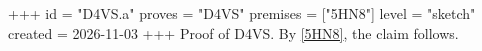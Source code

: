 +++
id = "D4VS.a"
proves = "D4VS"
premises = ["5HN8"]
level = "sketch"
created = 2026-11-03
+++
Proof of D4VS. By \ref{5HN8}, the claim follows.
